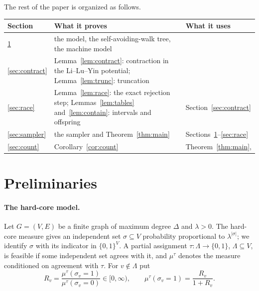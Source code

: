 \documentclass[11pt]{amsart}
\begin{document}
The rest of the paper is organized as follows.

\begin{center}
\begin{tabular}{@{}lp{}l@{}}
\toprule
Section & What it proves & What it uses\\
\midrule
\ref{sec:prelim} & the model, the self-avoiding-walk tree, the machine model & \cite[Theorem~3.1]{W06}\\
\ref{sec:contract} & Lemma~\ref{lem:contract}: contraction in the Li--Lu--Yin potential; Lemma~\ref{lem:trunc}: truncation & \cite{LLY}\\
\ref{sec:race} & Lemma~\ref{lem:race}: the exact rejection step; Lemmas~\ref{lem:tables} and~\ref{lem:contain}: intervals and offspring & Section~\ref{sec:contract}\\
\ref{sec:sampler} & the sampler and Theorem~\ref{thm:main} & Sections~\ref{sec:prelim}--\ref{sec:race}\\
\ref{sec:count} & Corollary~\ref{cor:count} & Theorem~\ref{thm:main}, \cite[Theorem~1.4]{CCLZ}\\
\bottomrule
\end{tabular}
\end{center}

\section{Preliminaries}\label{sec:prelim}

\paragraph{The hard-core model.} Let $G=(V,E)$ be a finite graph of maximum degree $\Delta$ and $\lambda>0$. The hard-core measure gives an independent set $\sigma\subseteq V$ probability proportional to $\lambda^{|\sigma|}$; we identify $\sigma$ with its indicator in $\{0,1\}^V$. A partial assignment $\tau\colon\Lambda\to\{0,1\}$, $\Lambda\subseteq V$, is feasible if some independent set agrees with it, and $\mu^\tau$ denotes the measure conditioned on agreement with $\tau$. For $v\notin\Lambda$ put
\[
R_v=\frac{\mu^\tau(\sigma_v=1)}{\mu^\tau(\sigma_v=0)}\in[0,\infty),
\qquad \mu^\tau(\sigma_v=1)=\frac{R_v}{1+R_v}.
\]
\end{document}
